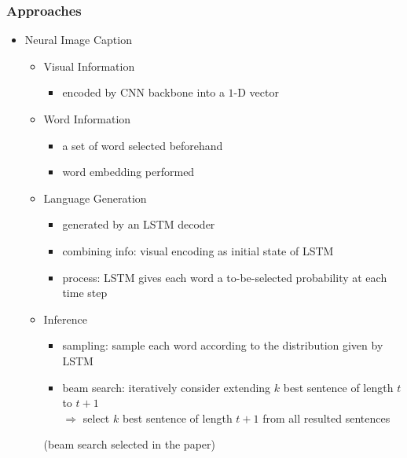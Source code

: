 \subsubsection{Approaches}
\begin{itemize}
\item Neural Image Caption
	\begin{itemize}
	\item Visual Information
		\begin{itemize}
		\item encoded by CNN backbone into a $1$-D vector
		\end{itemize}
	\item Word Information
		\begin{itemize}
		\item a set of word selected beforehand
		\item word embedding performed
		\end{itemize}
	\item Language Generation
		\begin{itemize}
		\item generated by an LSTM decoder
		\item combining info: visual encoding as initial state of LSTM
		\item process: LSTM gives each word a to-be-selected probability at each time step
		\end{itemize}
	\item Inference
		\begin{itemize}
		\item sampling: sample each word according to the distribution given by LSTM
		\item beam search: iteratively consider extending $k$ best sentence of length $t$ to $t+1$ \\
		$\Rightarrow$ select $k$ best sentence of length $t+1$ from all resulted sentences
		\end{itemize}
		(beam search selected in the paper)
	\end{itemize}


\end{itemize}
